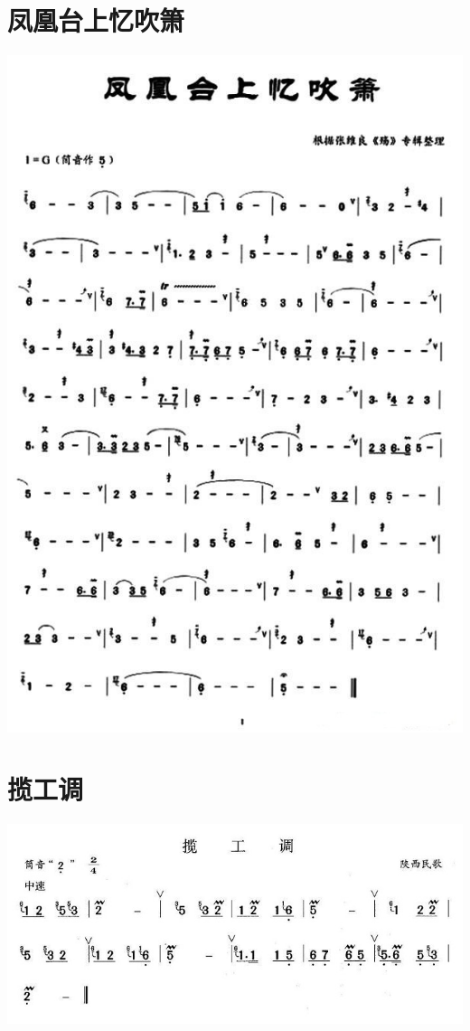 \documentclass[cn,pad,chinese,chinesefont=nofont]{elegantbook}
\begin{document}
\section{凤凰台上忆吹箫}
    \includegraphics[width=\textwidth]{dongxiao/20200323凤凰台上忆吹箫.jpg}
\section{揽工调}
    \includegraphics[width=\textwidth]{dongxiao/20200323揽工调.jpg}
    
\end{document}
